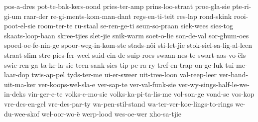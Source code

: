 {pos-a-dres
pot-te-bak-kers-oond
pries-ter-amp
prins-loo-straat
proe-gla-sie
pte-ri-gi-um
raar-der
re-gi-ments-kom-man-dant
regs-en-ti-teit
res-lap
rond-skink
rooi-poot-el-sie
room-ter-te
ru-staal
se-ren-ge-ti
seun-so-praan
siek-wees
sies-tog
skaats-loop-baan
skree-tjies
slet-jie
snik-warm
soet-o-lie
son-de-val
sor-ghum-oes
spoed-oe-fe-nin-ge
spoor-weg-in-kom-ste
stads-nôi
sti-let-jie
stok-siel-sa-lig-al-leen
straat-slim
stre-pies-fer-weel
suid-ein-de
suip-roes
swaan-nes-te
swart-aas-vo-ëls
swie-ren-ga
ta-ke-la-sie
teen-sank-sies
tip-pe-ra-ry
tref-en-trap-on-ge-luk
tui-me-laar-dop
twis-ap-pel
tyds-ter-me
ui-er-sweer
uit-tree-loon
val-reep-leer
ver-band-uit-ma-ker
ver-koops-wel-sla-e
ver-sap-te
ver-val-funk-sie
ver-wy-sings-half-le-we-in-deks
vin-ger-e-te
volks-e-mo-sie
volks-ka-pi-ta-lis-me
vol-son-ge
vond-se
vos-kop
vre-des-en-gel
vre-des-par-ty
wa-pen-stil-stand
wa-ter-ver-koe-lings-to-rings
we-du-wee-skof
wel-oor-wo-ë
werp-lood
wes-oe-wer
xho-sa-tjie
}
